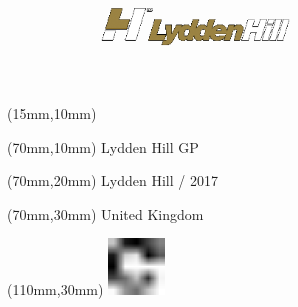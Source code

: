 \null\newpage
\begin{textblock*}{50mm}(15mm,10mm)%
\includegraphics[width=50mm]{LG/LYD.png}
\end{textblock*}
\begin{textblock*}{130mm}(70mm,10mm)%
{\fontsize{20}{20}\selectfont Lydden Hill GP}\\
\end{textblock*}
\begin{textblock*}{120mm}(70mm,20mm)%
{\fontsize{16}{16}\selectfont Lydden Hill / 2017}\\
\end{textblock*}
\begin{textblock*}{120mm}(70mm,30mm)%
{\fontsize{12}{12}\selectfont United Kingdom}
\end{textblock*}
\begin{textblock*}{30mm}(110mm,30mm)%
\centering
\includegraphics[height=15mm]{icons/fa-rotate-right.pdf}
\end{textblock*}
